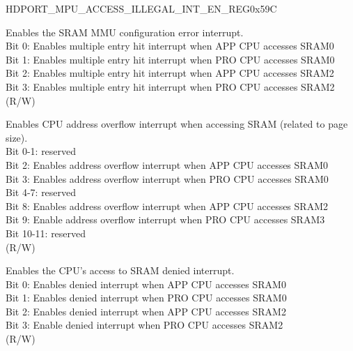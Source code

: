 \begin{register}{H}{DPORT\_MPU\_ACCESS\_ILLEGAL\_INT\_EN\_REG}{0x59C}\label{regdesc:MPUACCESSILLEGALINTENAREG}
%
%
%
%
%
\regnewline%
\begin{regdesc}\begin{reglist}
\item [DPORT\_MEM\_MMU\_MULTI\_HIT\_INT\_EN]  Enables the SRAM MMU configuration error interrupt.\\
Bit 0: Enables multiple entry hit interrupt when APP CPU accesses SRAM0\\
Bit 1: Enables multiple entry hit interrupt when PRO CPU accesses SRAM0\\
Bit 2: Enables multiple entry hit interrupt when APP CPU accesses SRAM2\\
Bit 3: Enables multiple entry hit interrupt when PRO CPU accesses SRAM2\\
(R/W)
\item [DPORT\_MEM\_ACCESS\_ILLEGAL\_INT\_EN] Enables CPU address overflow interrupt when accessing SRAM (related to page size). \\
Bit 0-1: reserved\\
Bit 2: Enables address overflow interrupt when APP CPU accesses SRAM0\\
Bit 3: Enables address overflow interrupt when PRO CPU accesses SRAM0\\
Bit 4-7: reserved\\
Bit 8: Enables address overflow interrupt when APP CPU accesses SRAM2\\
Bit 9: Enable address overflow interrupt when PRO CPU accesses SRAM3\\
Bit 10-11: reserved\\
(R/W)
\item [DPORT\_MEM\_ACCESS\_DENY\_INT\_EN] Enables the CPU's access to SRAM denied interrupt. \\
Bit 0: Enables denied interrupt when APP CPU accesses SRAM0\\
Bit 1: Enables denied interrupt when PRO CPU accesses SRAM0\\
Bit 2: Enables denied interrupt when APP CPU accesses SRAM2\\
Bit 3: Enable denied interrupt when PRO CPU accesses SRAM2\\
(R/W)
\end{reglist}\end{regdesc}
\end{register}

